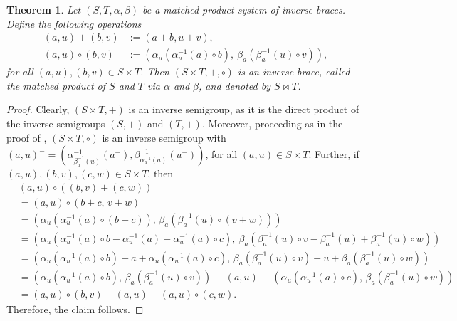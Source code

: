 \documentclass[preprint,1p]{elsarticle}
\newtheorem{theor}{Theorem}[section]
\theoremstyle{definition}               %
\newtheorem{rem}[theor]{Remark}
\DeclareMathOperator{\E}{E}
\begin{document}
\begin{theor}\label{18}
Let $(S, T, \alpha,\beta)$ be a matched product system of inverse braces.  
Define the following operations
\begin{align*}
(a,u) + (b,v) &:= (a + b, u + v),\\
(a,u) \circ (b,v) &:= \left(\alpha_u\left(\alpha_u^{-1}(a)\circ b\right),\ \beta_a\left(\beta_a^{-1}(u)\circ v\right)\right),
\end{align*}
for all $(a,u),(b,v) \in S \times T$.
    Then $(S \times T, +, \circ)$ is an inverse brace, called the \emph{matched product of $S$ and $T$ via $\alpha$ and $\beta$}, and denoted by $S \bowtie T$. 
\end{theor}
\begin{proof}
Clearly, $(S \times T,+)$ is an inverse semigroup, as it is the direct product of the inverse semigroups $(S,+)$ and $(T,+)$. Moreover, proceeding as in the proof of \cite[Theorem 12]{CaMaSt21}, $(S \times T,\circ)$ is an inverse semigroup with $(a, u)^-=\left(\alpha^{-1}_{\beta^{-1}_a(u)}(a^-),\beta^{-1}_{\alpha^{-1}_u(a)}(u^-)\right)$, for all $(a, u) \in S \times T$. Further, if $(a,u),(b,v),(c,w) \in S \times T$, then
\begin{align*}
&(a,u) \circ \left((b,v)+(c,w)\right)\\
&=(a,u)\circ(b+c,\, v+w)\\
&=\left(\alpha_u\left(\alpha^{-1}_u(a)\circ (b+c)\right),\,
       \beta_a\left(\beta^{-1}_a(u)\circ (v+w)\right)\right)\\
&=\left(\alpha_u\left(\alpha^{-1}_u(a)\circ b-\alpha^{-1}_u(a)+\alpha^{-1}_u(a)\circ c\right), \ \beta_a\left(\beta^{-1}_a(u)\circ v-\beta^{-1}_a(u)+\beta^{-1}_a(u)\circ w\right)\right)\\
&=\left(\alpha_u\left(\alpha^{-1}_u(a)\circ b\right)-a+\alpha_u\left(\alpha^{-1}_u(a)\circ c\right),\, \beta_a\left(\beta^{-1}_a(u)\circ v\right)-u+\beta_a\left(\beta^{-1}_a(u)\circ w\right)\right)\\
&=\left(\alpha_u\left(\alpha^{-1}_u(a)\circ b\right),\,\beta_a\left(\beta^{-1}_a(u)\circ v\right)\right)
 \, -(a,u) \,
 +\left(\alpha_u\left(\alpha^{-1}_u(a)\circ c\right),\,\beta_a\left(\beta^{-1}_a(u)\circ w\right)\right)\\
&=(a,u) \circ (b,v) -(a,u) + (a,u) \circ (c,w).
\end{align*}
Therefore, the claim follows. 
\end{proof}


\smallskip


\end{document}
